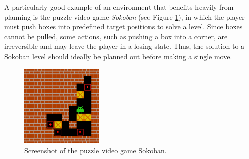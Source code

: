 A particularly good example of an environment that benefits heavily from planning is the puzzle video game \textit{Sokoban} (see Figure \ref{fig:sokoban}), in which the player must push boxes into predefined target positions to solve a level. Since boxes cannot be pulled, some actions, such as pushing a box into a corner, are irreversible and may leave the player in a losing state. Thus, the solution to a Sokoban level should ideally be planned out before making a single move.
\begin{figure}[ht]
    \centering
    \includegraphics[width=0.35\textwidth]{assets/sokoban.png}
    \caption{Screenshot of the puzzle video game Sokoban. \cite{sokoban}}
    \label{fig:sokoban}
\end{figure}